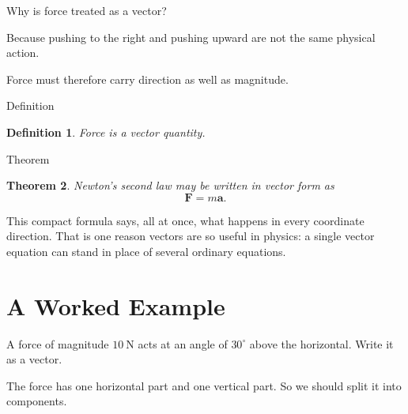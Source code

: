 \documentclass[11pt,a4paper]{article}
\newtheorem{theorem}{Theorem}[section]
\newtheorem{definition}[theorem]{Definition}
\newcommand{\vect}[1]{\boldsymbol{#1}}
\begin{document}
\begin{problemblock}
Why is force treated as a vector?
\end{problemblock}

\begin{solutionblock}
Because pushing to the right and pushing upward are not the same physical action.

Force must therefore carry direction as well as magnitude.
\end{solutionblock}

\begin{mathblock}{Definition}
\begin{definition}
Force is a vector quantity.
\end{definition}
\end{mathblock}

\begin{mathblock}{Theorem}
\begin{theorem}
Newton's second law may be written in vector form as
\[
\vect{F} = m\vect{a}.
\]
\end{theorem}
\end{mathblock}

This compact formula says, all at once, what happens in every coordinate direction.
That is one reason vectors are so useful in physics: a single vector equation can
stand in place of several ordinary equations.

\section{A Worked Example}

\begin{problemblock}
A force of magnitude \(10\ \mathrm{N}\) acts at an angle of \(30^\circ\) above the horizontal.
Write it as a vector.
\end{problemblock}

\begin{intuitionblock}
The force has one horizontal part and one vertical part.
So we should split it into components.
\end{intuitionblock}

\begin{center}
\end{center}
\end{document}
